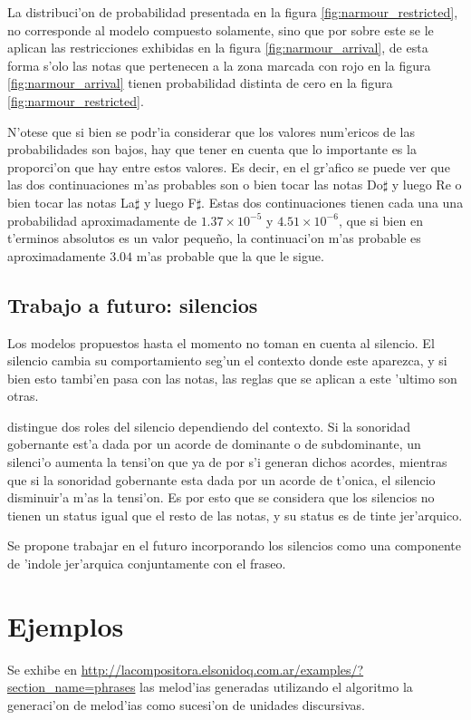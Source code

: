 La distribuci'on de probabilidad presentada en la figura \ref{fig:narmour_restricted}, no corresponde al modelo compuesto solamente, sino 
que por sobre este se le aplican las restricciones exhibidas en la figura \ref{fig:narmour_arrival}, de esta forma s'olo las notas que 
pertenecen a la zona marcada con rojo en la figura \ref{fig:narmour_arrival} tienen probabilidad distinta de cero en la figura \ref{fig:narmour_restricted}.

N'otese que si bien se podr'ia considerar que los valores num'ericos de las probabilidades son bajos, hay que tener en cuenta que lo 
importante es la proporci'on que hay entre estos valores. Es decir, en el gr'afico se puede ver que las dos continuaciones m'as 
probables son o bien tocar las notas Do$\sharp$ y luego Re o bien tocar las notas La$\sharp$ y luego F$\sharp$. Estas dos continuaciones 
tienen cada una una probabilidad aproximadamente de $1.37\times10^{-5}$ y $4.51\times10^{-6}$, que si bien en t'erminos absolutos es 
un valor pequeño, la continuaci'on m'as probable es aproximadamente $3.04$ m'as probable que la que le sigue. 

\subsection{Trabajo a futuro: silencios}
Los modelos propuestos hasta el momento no toman en cuenta al silencio. 
El silencio cambia su comportamiento seg'un el contexto donde este aparezca, y si bien esto tambi'en pasa con las notas, las reglas que se
aplican a este 'ultimo son otras. 

\cite{Margulis08} distingue dos roles del silencio dependiendo del contexto. Si la sonoridad gobernante est'a dada por un acorde de dominante
o de subdominante, un silenci'o aumenta la tensi'on que ya de por s'i generan dichos acordes, mientras que si la sonoridad gobernante
esta dada por un acorde de t'onica, el silencio disminuir'a m'as la tensi'on. Es por esto que se considera que los silencios no tienen 
un status igual que el resto de las notas, y su status es de tinte jer'arquico.

Se propone trabajar en el futuro incorporando los silencios como una componente de 'indole jer'arquica conjuntamente con el fraseo.

\section{Ejemplos}
Se exhibe en \url{http://lacompositora.elsonidoq.com.ar/examples/?section_name=phrases} las melod'ias generadas utilizando
el algoritmo la generaci'on de melod'ias como sucesi'on de unidades discursivas.
